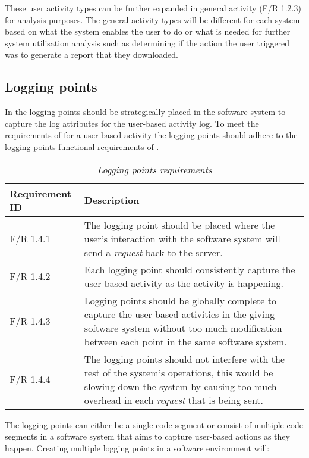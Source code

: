 These user activity types can be further expanded in general activity (F/R 1.2.3) for analysis purposes. The general activity types will be different for each system based on what the system enables the user to do or what is needed for further system utilisation analysis such as determining if the action the user triggered was to generate a report that they downloaded.

\clearpage

\subsection{Logging points}\label{sec:ch2_loggingPoints}
In  the logging points should be strategically placed in the software system to capture the log attributes for the user-based activity log. To meet the requirements of  for a user-based activity the logging points should adhere to the logging points functional requirements of .

\begin{table}[!htb]
	\centering
	\caption[Logging points requirements]
	{\textit{Logging points requirements}}
	\label{tbl:ch2_loggingPointRequirement}
	\begin{tabularx}{\textwidth}{|l|X|}
		\hline \textbf{Requirement ID} & \textbf{Description} \\
		\hline F/R 1.4.1 & The logging point should be placed where the user's interaction with the software system will send a \textit{request} back to the server.\\
		\hline F/R 1.4.2 & Each logging point should consistently capture the user-based activity as the activity is happening. \\
		\hline F/R 1.4.3 & Logging points should be globally complete to capture the user-based activities in the giving software system without too much modification between each point in the same
		software system. \\
		\hline F/R 1.4.4 & The logging points should not interfere with the rest of the system's operations, this would be slowing down the system by causing too much overhead in each \textit{request}
		that is being sent. \\
		\hline
	\end{tabularx}
\end{table}

The logging points can either be a single code segment or consist of multiple code segments in a software system that aims to capture user-based actions as they happen. Creating multiple logging points in a software environment will:

